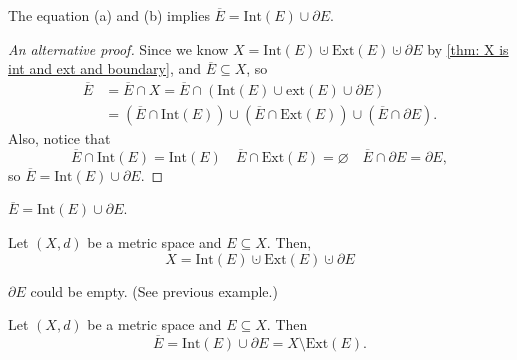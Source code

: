 \begin{remark}
    The equation (a) and (b) implies \(\overline{E} = \mathrm{Int}(E) \cup \partial E  \). 
\end{remark}
\begin{proof}[An alternative proof]
    Since we know \(X = \mathrm{Int}(E)  \cupdot \mathrm{Ext}(E) \cupdot \partial E \) by \autoref{thm: X is int and ext and boundary}, and \(\overline{E} \subseteq X \), so 
    \begin{align*}
        \overline{E} &= \overline{E} \cap X = \overline{E} \cap (\mathrm{Int}(E) \cup \mathrm{ext}(E) \cup \partial E )   \\
        &= (\overline{E} \cap \mathrm{Int}(E) ) \cup (\overline{E} \cap \mathrm{Ext}(E) ) \cup (\overline{E} \cap \partial E). 
    \end{align*}
    Also, notice that 
    \[
        \overline{E} \cap \mathrm{Int}(E) = \mathrm{Int}(E) \quad \overline{E} \cap \mathrm{Ext}(E) = \varnothing \quad \overline{E} \cap \partial E = \partial E,    
    \] so \(\overline{E} = \mathrm{Int}(E) \cup \partial E\). 
\end{proof}

\begin{corollary} \label{cl: Ebar is IntE cup ptE}
    \(\overline{E} = \mathrm{Int}(E) \cup \partial E  \). 
\end{corollary}

\begin{theorem} \label{thm: X is int and ext and boundary}
    Let \((X,d)\) be a metric space and \(E \subseteq X\). Then, 
    \[
        X = \mathrm{Int}(E) \cupdot \mathrm{Ext}(E) \cupdot \partial E  
    \]  
\end{theorem}

\begin{remark}
    \(\partial E\) could be empty. (See previous example.) 
\end{remark}

\begin{corollary}
    Let \((X,d)\) be a metric space and \(E \subseteq X\). Then 
    \[
        \overline{E} = \mathrm{Int}(E) \cup \partial E = X \setminus \mathrm{Ext}(E).   
    \]  
\end{corollary}

